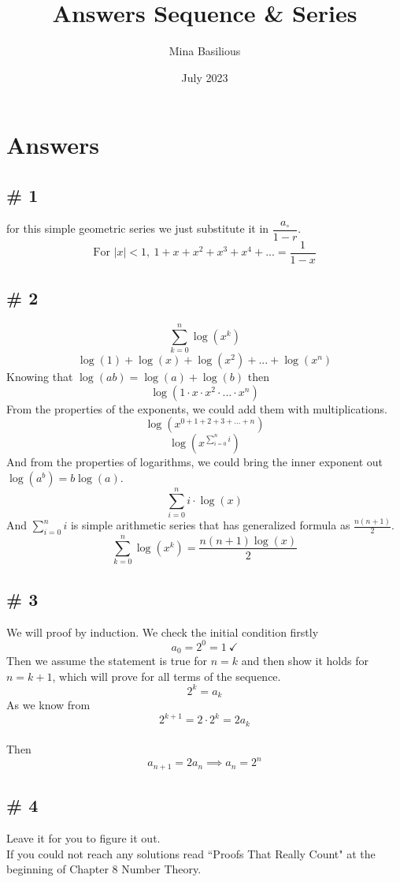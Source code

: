 \documentclass{article}
\title{Answers Sequence \& Series}
\author{Mina Basilious}
\date{July 2023}
\begin{document}
\maketitle

\section*{Answers}
\subsection*{\# 1}
for this simple geometric series we just substitute it in $\dfrac{a_\circ}{1-r}$.\\
$$\text{For } |x|<1, \ 1+x+x^2+x^3+x^4+...=\boxed{\frac{1}{1-x}}$$
\subsection*{\# 2}
$$\sum_{k=0}^n \log(x^k)$$
$$\log(1)+\log(x)+\log(x^2)+...+\log(x^n)$$
Knowing that $\log(ab)=\log(a)+\log(b)$ then
$$\log(1\cdot x \cdot x^2 \cdot ... \cdot x^n)$$
From the properties of the exponents, we could add them with multiplications.
$$\log(x^{0+1+2+3+...+n})$$
$$\log(x^{\sum_{i=0}^ni})$$
And from the properties of logarithms, we could bring the inner exponent out $\log(a^b)=b\log(a)$.
$$\sum_{i=0}^ni \cdot \log(x)$$
And $\sum_{i=0}^ni$ is simple arithmetic series that has generalized formula as $\frac{n(n+1)}{2}$.
$$\sum_{k=0}^n \log(x^k)=\boxed{\frac{n(n+1)\log(x)}{2}}$$
\subsection*{\# 3}
We will proof by induction.
We check the initial condition firstly
$$a_0=2^0=1 \ \checkmark$$
Then we assume the statement is true for $n=k$ and then show it holds for $n=k+1$, which will prove for all terms of the sequence.
$$2^k = a_k$$
As we know from
$$2^{k+1}=2 \cdot 2^k = 2a_k$$\\
Then\\
$$a_{n+1}=2a_n \implies a_n = 2^n$$

\subsection*{\# 4}
Leave it for you to figure it out.\\
If you could not reach any solutions read ``Proofs That Really Count" at the beginning of Chapter 8 Number Theory.
\end{document}
